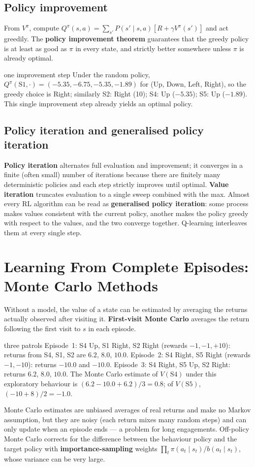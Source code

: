 \documentclass[11pt]{article}
\begin{document}
\subsection{Policy improvement}
From $V^\pi$, compute $Q^\pi(s,a)=\sum_{s'}P(s'\mid s,a)[R+\gamma V^\pi(s')]$ and act greedily. The \textbf{policy improvement theorem} guarantees that the greedy policy is at least as good as $\pi$ in every state, and strictly better somewhere unless $\pi$ is already optimal.
\begin{example}{one improvement step}
Under the random policy, $Q^\pi(\text{S1},\cdot)=(-5.35,-6.75,-5.35,-1.89)$ for (Up, Down, Left, Right), so the greedy choice is Right; similarly S2: Right (10); S4: Up ($-5.35$); S5: Up ($-1.89$). This single improvement step already yields an optimal policy.
\end{example}
\subsection{Policy iteration and generalised policy iteration}
\textbf{Policy iteration} alternates full evaluation and improvement; it converges in a finite (often small) number of iterations because there are finitely many deterministic policies and each step strictly improves until optimal. \textbf{Value iteration} truncates evaluation to a single sweep combined with the max. Almost every RL algorithm can be read as \textbf{generalised policy iteration}: some process makes values consistent with the current policy, another makes the policy greedy with respect to the values, and the two converge together. Q-learning interleaves them at every single step.

\section{Learning From Complete Episodes: Monte Carlo Methods}
Without a model, the value of a state can be estimated by averaging the returns actually observed after visiting it. \textbf{First-visit Monte Carlo} averages the return following the first visit to $s$ in each episode.
\begin{example}{three patrols}
Episode~1: S4 Up, S1 Right, S2 Right (rewards $-1,-1,+10$): returns from S4, S1, S2 are $6.2$, $8.0$, $10.0$. Episode~2: S4 Right, S5 Right (rewards $-1,-10$): returns $-10.0$ and $-10.0$. Episode~3: S4 Right, S5 Up, S2 Right: returns $6.2$, $8.0$, $10.0$. The Monte Carlo estimate of $V(\text{S4})$ under this exploratory behaviour is $(6.2-10.0+6.2)/3=0.8$; of $V(\text{S5})$, $(-10+8)/2=-1.0$.
\end{example}
Monte Carlo estimates are unbiased averages of real returns and make no Markov assumption, but they are noisy (each return mixes many random steps) and can only update when an episode ends --- a problem for long engagements. Off-policy Monte Carlo corrects for the difference between the behaviour policy and the target policy with \textbf{importance-sampling} weights $\prod_t\pi(a_t\mid s_t)/b(a_t\mid s_t)$, whose variance can be very large.
\end{document}
